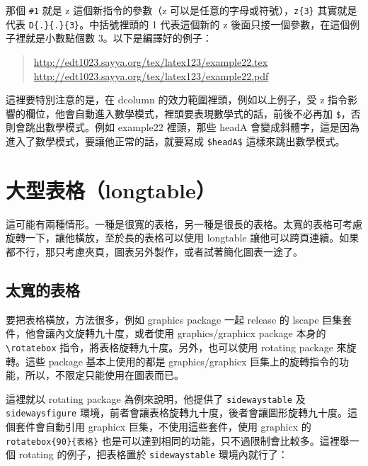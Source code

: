 那個 \verb|#1| 就是 {\ttfamily z} 這個新指令的參數（{\ttfamily z} 可以是任意的字母或符號），\verb|z{3}| 其實就是代表 \verb|D{.}{.}{3}|。中括號裡頭的 1 代表這個新的 {\ttfamily z} 後面只接一個參數，在這個例子裡就是小數點個數 3。以下是編譯好的例子：

\begin{quote}
  \url{http://edt1023.sayya.org/tex/latex123/example22.tex}\\
  \url{http://edt1023.sayya.org/tex/latex123/example22.pdf}
\end{quote}

這裡要特別注意的是，在 \textsf{dcolumn} 的效力範圍裡頭，例如以上例子，受 {\ttfamily z} 指令影響的欄位，他會自動進入數學模式，裡頭要表現數學式的話，前後不必再加 \verb|$|，否則會跳出數學模式。例如 {\ttfamily example22} 裡頭，那些 headA 會變成斜體字，這是因為進入了數學模式，要讓他正常的話，就要寫成 \verb|$headA$| 這樣來跳出數學模式。

\section{大型表格（longtable）}
\label{sec:longtable}

這可能有兩種情形。一種是很寬的表格，另一種是很長的表格。太寬的表格可考慮旋轉一下，讓他橫放，至於長的表格可以使用 \textsf{longtable} 讓他可以跨頁連續。如果都不行，那只考慮夾頁，圖表另外製作，或者試著簡化圖表一途了。

\subsection{太寬的表格}

要把表格橫放，方法很多，例如 \textsf{graphics} package 一起 release 的 \textsf{lscape} 巨集套件，他會讓內文旋轉九十度，或者使用 \textsf{graphics/graphicx} package 本身的 \verb|\rotatebox| 指令，將表格旋轉九十度。另外，也可以使用 \textsf{rotating} package 來旋轉。這些 package 基本上使用的都是 \textsf{graphics/graphicx} 巨集上的旋轉指令的功能，所以，不限定只能使用在圖表而已。

這裡就以 \textsf{rotating} package 為例來說明，他提供了 \texttt{sidewaystable} 及 \texttt{sidewaysfigure} 環境，前者會讓表格旋轉九十度，後者會讓圖形旋轉九十度。這個套件會自動引用 \textsf{graphicx} 巨集，不使用這些套件，使用 \textsf{graphicx} 的 \verb|rotatebox{90}{表格}| 也是可以達到相同的功能，只不過限制會比較多。這裡舉一個 \textsf{rotating} 的例子，把表格置於 \texttt{sidewaystable} 環境內就行了：

